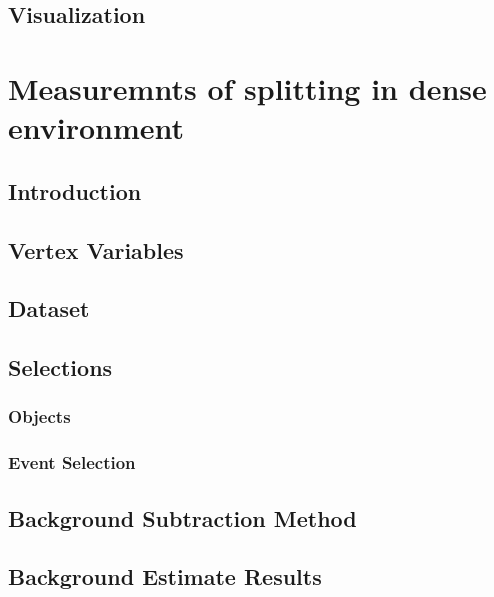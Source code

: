 \documentclass{report}
\begin{document}
\section{Visualization}

\clearpage

\chapter{Measuremnts of \gbb splitting in dense environment}
\label{chap:gbb}
\section{Introduction}

\clearpage

\section{Vertex Variables}
\label{sec:gbb-var}

\clearpage

\section{Dataset}

\clearpage

\section{Selections}
\label{sec:gbb-selection}
\subsection{Objects}

\subsection{Event Selection}

\clearpage

\section{Background Subtraction Method}

\clearpage

\section{Background Estimate Results}

\clearpage
\end{document}
